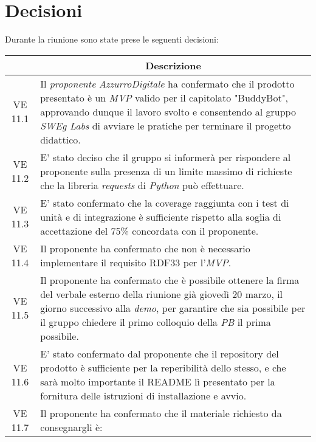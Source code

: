 

\section{Decisioni}

Durante la riunione sono state prese le seguenti decisioni:

\vspace{0.5cm}

\begin{table}[htbp]
    \centering
    \begin{tabular}{|c|p{}|}
        \hline
        \rowcolor[gray]{0.75}
        \multicolumn{1}{|c|}{\textbf{Codice}} & \multicolumn{1}{|c|}{\textbf{Descrizione}}\\
        \hline
        VE 11.1 & Il \emph{proponente} \emph{AzzurroDigitale} ha confermato che il prodotto presentato è un \emph{MVP} valido per il capitolato "BuddyBot", approvando dunque il lavoro svolto e consentendo al gruppo \emph{SWEg Labs} di avviare le pratiche per terminare il progetto didattico.\\ \hline
        VE 11.2 & E' stato deciso che il gruppo si informerà per rispondere al proponente sulla presenza di un limite massimo di richieste che la libreria \emph{requests} di \emph{Python} può effettuare.\\ \hline
        VE 11.3 & E' stato confermato che la coverage raggiunta con i test di unità e di integrazione è sufficiente rispetto alla soglia di accettazione del 75\% concordata con il proponente.\\ \hline
        VE 11.4 & Il proponente ha confermato che non è necessario implementare il requisito RDF33 per l'\emph{MVP}.\\ \hline
        VE 11.5 & Il proponente ha confermato che è possibile ottenere la firma del verbale esterno della riunione già giovedì 20 marzo, il giorno successivo alla \emph{demo}, per garantire che sia possibile per il gruppo chiedere il primo colloquio della \emph{PB} il prima possibile.\\ \hline
        VE 11.6 & E' stato confermato dal proponente che il repository del prodotto è sufficiente per la reperibilità dello stesso, e che sarà molto importante il README lì presentato per la fornitura delle istruzioni di installazione e avvio.\\ \hline
        VE 11.7 & Il proponente ha confermato che il materiale richiesto da consegnargli è:

\end{tabular}
\end{table}
